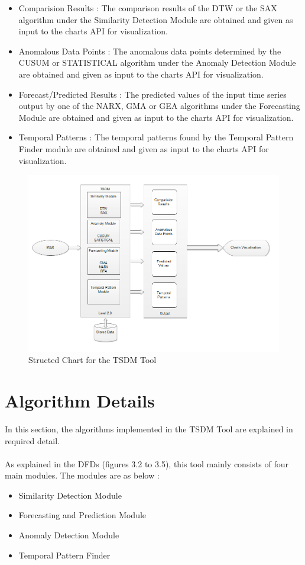 \documentclass[12pt,a4paper]{report}
\begin{document}
\begin{itemize}
\item Comparision Results  : The comparison results of the DTW or the SAX algorithm under the Similarity Detection Module are obtained and given as input to the charts API for visualization.
\item Anomalous Data Points  : The anomalous data points determined by the CUSUM or STATISTICAL algorithm under the Anomaly Detection Module are obtained and given as input to the charts API for visualization.
\item Forecast/Predicted Results  : The predicted values of the input time series output by one of the NARX, GMA or GEA algorithms under the Forecasting Module are obtained and given as input to the charts API for visualization.
\item Temporal Patterns  : The temporal patterns found by the Temporal Pattern Finder module are obtained and given as input to the charts API for visualization.
\end{itemize}
\begin{figure}[h!]
	\centering
		\includegraphics[scale=0.6]{screenshots/structured_chart.png}
		\caption{Structed Chart for the TSDM Tool }
\end{figure}

\section{Algorithm Details}
In this section, the algorithms implemented in the TSDM Tool are explained in required detail.

\paragraph{} As explained in the DFDs (figures 3.2 to 3.5), this tool mainly consists of four main modules.
The modules are as below :
\begin{itemize}
\item Similarity Detection Module
\item Forecasting and Prediction Module
\item Anomaly Detection Module
\item Temporal Pattern Finder 
\end{itemize}
\end{document}
